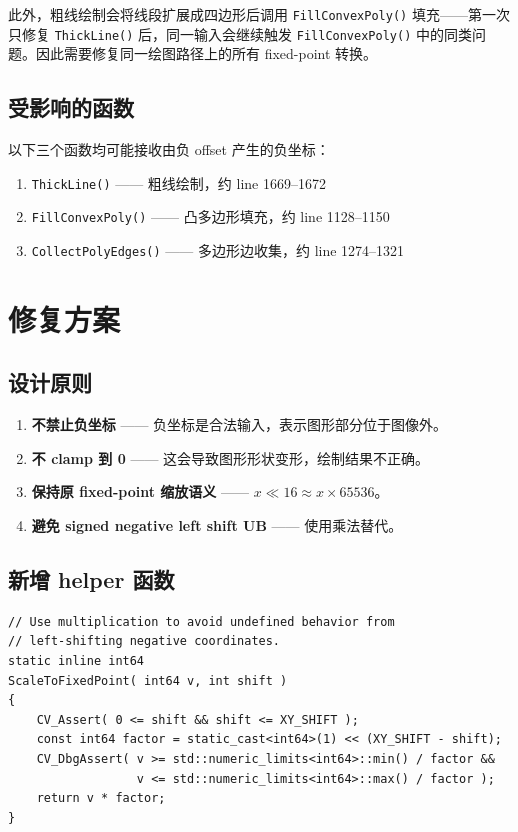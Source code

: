 \documentclass[12pt,a4paper]{article}
\begin{document}
此外，粗线绘制会将线段扩展成四边形后调用 \texttt{FillConvexPoly()} 填充——第一次只修复 \texttt{ThickLine()} 后，同一输入会继续触发 \texttt{FillConvexPoly()} 中的同类问题。因此需要修复同一绘图路径上的所有 fixed-point 转换。

\subsection{受影响的函数}

以下三个函数均可能接收由负 offset 产生的负坐标：

\begin{enumerate}[leftmargin=*]
    \item \texttt{ThickLine()} —— 粗线绘制，约 line 1669–1672
    \item \texttt{FillConvexPoly()} —— 凸多边形填充，约 line 1128–1150
    \item \texttt{CollectPolyEdges()} —— 多边形边收集，约 line 1274–1321
\end{enumerate}

\section{修复方案}

\subsection{设计原则}

\begin{enumerate}[leftmargin=*]
    \item \textbf{不禁止负坐标} —— 负坐标是合法输入，表示图形部分位于图像外。
    \item \textbf{不 clamp 到 0} —— 这会导致图形形状变形，绘制结果不正确。
    \item \textbf{保持原 fixed-point 缩放语义} —— $x \ll 16 \approx x \times 65536$。
    \item \textbf{避免 signed negative left shift UB} —— 使用乘法替代。
\end{enumerate}

\subsection{新增 helper 函数}

\begin{lstlisting}
// Use multiplication to avoid undefined behavior from
// left-shifting negative coordinates.
static inline int64
ScaleToFixedPoint( int64 v, int shift )
{
    CV_Assert( 0 <= shift && shift <= XY_SHIFT );
    const int64 factor = static_cast<int64>(1) << (XY_SHIFT - shift);
    CV_DbgAssert( v >= std::numeric_limits<int64>::min() / factor &&
                  v <= std::numeric_limits<int64>::max() / factor );
    return v * factor;
}
\end{lstlisting}
\end{document}
